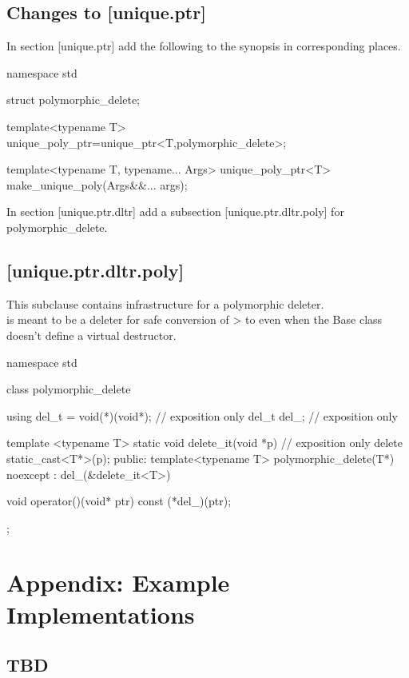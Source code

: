 \documentclass[ebook,11pt,article]{memoir}
\begin{document}
\section{Changes to [unique.ptr] }
In section [unique.ptr] add the following to the  synopsis in corresponding places.

\begin{codeblock}
namespace std{

struct polymorphic_delete;

template<typename T>
unique_poly_ptr=unique_ptr<T,polymorphic_delete>;

template<typename T, typename... Args>
unique_poly_ptr<T> make_unique_poly(Args&&... args);

}
\end{codeblock}

In section [unique.ptr.dltr] add a subsection [unique.ptr.dltr.poly] for polymorphic_delete.

\section{ [unique.ptr.dltr.poly]}
\pnum
This subclause contains infrastructure for a polymorphic deleter.\\

\pnum
\enternote
{} is meant to be a deleter for safe conversion of > to  even when the Base class doesn't define a virtual destructor.
\exitnote

\begin{codeblock}
namespace std{

class polymorphic_delete{
   using del_t = void(*)(void*); // exposition only
   del_t del_; // exposition only
 
   template <typename T>
   static void delete_it(void *p) // exposition only
   {
      delete static_cast<T*>(p);
   }
public:
   template<typename T>
   polymorphic_delete(T*) noexcept
     : del_(&delete_it<T>)
   {}
 
   void operator()(void* ptr) const
   {
     (*del_)(ptr);
   }

};
}
\end{codeblock}


\chapter{Appendix: Example Implementations}
\section{TBD}
\begin{codeblock}
\end{codeblock}
\end{document}
